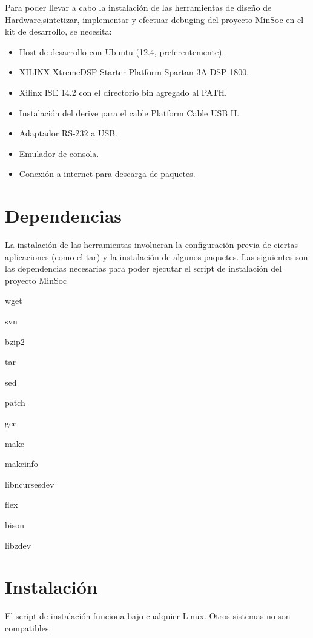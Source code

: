  Para poder llevar a cabo la instalación de las herramientas de diseño de Hardware,sintetizar, implementar y efectuar debuging  del proyecto MinSoc en el kit de desarrollo, se necesita:

\begin{itemize}
\item Host de desarrollo con Ubuntu (12.4, preferentemente).
\item XILINX XtremeDSP Starter Platform Spartan 3A DSP 1800.
\item Xilinx ISE 14.2 con el directorio bin agregado al PATH.
\item Instalación del derive para el cable Platform Cable USB II.
\item Adaptador RS-232 a USB.
\item Emulador de consola.
\item Conexión a internet para descarga de paquetes.

\end{itemize} 



\section{Dependencias}

La instalación de las herramientas involucran la configuración previa de ciertas aplicaciones (como el tar) y la instalación de algunos paquetes.
Las siguientes son las dependencias necesarias para poder ejecutar el script de instalación del proyecto MinSoc

wget

svn

bzip2

tar

sed

patch

gcc

make

makeinfo

libncurses\-dev

flex

bison

libz\-dev 


 
\section{Instalación }

El script de instalación funciona bajo cualquier Linux. Otros sistemas no son compatibles.

